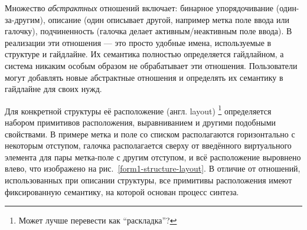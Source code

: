 %

Множество \emph{абстрактных} отношений включает: бинарное упорядочивание (один-за-другим),
описание (один описывает другой, например метка поле ввода или галочку), подчиненность (галочка делает активным/неактивным поле ввода).
В реализации эти отношения --- это просто удобные имена, используемые в структуре и гайдлайне.
Их семантика полностью определяется гайдлайном, а система никаким особым образом не обрабатывает эти отношения.
Пользователи могут добавлять новые абстрактные отношения и определять их семантику в гайдлайне для своих нужд.


Для конкретной структуры её расположение (англ. layout) \footnote{Может лучше перевести как \enquote{раскладка}?}
определяется набором примитивов расположения, выравниванием и другими подобными свойствами.
В примере метка и поле со списком располагаются горизонтально с некоторым отступом, галочка располагается сверху от
введённого виртуального элемента для пары метка-поле с другим отступом, и всё расположение выровнено влево, что изображено на рис.~\ref{form1-structure-layout}. В отличие от отношений, использованных при описании структуры,
все примитивы расположения имеют фиксированную семантику, на которой основан процесс синтеза.


